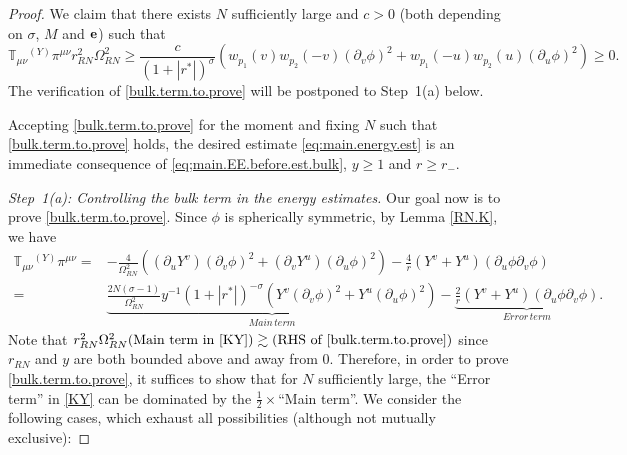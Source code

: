 \documentclass[10pt, reqno]{amsart}
\theoremstyle{definition}
\theoremstyle{remark}
\numberwithin{equation}{section}
\newcommand{\rd}{\partial}
\newcommand{\0}{\emptyset}
\newcommand{\Omg}{\Omega}
\newcommand{\f}{\frac}
\newcommand{\pfstep}[1]{\vspace{.5em} {\it #1.}}
\begin{document}
\begin{proof}
We claim that there exists $N$ sufficiently large and $c>0$ (both depending on $\sigma$, $M$ and ${\bf e}$) such that
\begin{equation}\label{bulk.term.to.prove}
\mathbb T_{\mu\nu}{ }^{(Y)}\pi^{\mu\nu}r_{RN}^2 \Omg_{RN}^2\geq \f{c}{(1+|r^*|)^{\sigma}}(w_{p_1}(v)w_{p_2}(-v)(\rd_v\phi)^2+w_{p_1}(-u)w_{p_2}(u)(\rd_u\phi)^2)\geq 0.
\end{equation}
The verification of \eqref{bulk.term.to.prove} will be postponed to Step~1(a) below.

Accepting \eqref{bulk.term.to.prove} for the moment and fixing $N$ such that \eqref{bulk.term.to.prove} holds, the desired estimate \eqref{eq:main.energy.est} is an immediate consequence of \eqref{eq;main.EE.before.est.bulk}, $y\geq 1$ and $r\geq r_-$.

\pfstep{Step~1(a): Controlling the bulk term in the energy estimates} Our goal now is to prove \eqref{bulk.term.to.prove}. Since $\phi$ is spherically symmetric, by Lemma \ref{RN.K}, we have
\begin{equation}\label{KY}
\begin{split}
\mathbb T_{\mu\nu}{ }^{(Y)}\pi^{\mu\nu}=&-\f{4}{\Omg_{RN}^2}\left((\rd_uY^v)(\rd_v\phi)^2+(\rd_vY^u)(\rd_u\phi)^2\right)-\f {4}r (Y^v+Y^u)(\rd_u\phi\rd_v\phi)\\
=&\underbrace{\f{2N(\sigma-1)}{\Omg_{RN}^2}y^{-1}(1+|r^*|)^{-\sigma}\left(Y^v(\rd_v\phi)^2+Y^u(\rd_u\phi)^2\right)}_{Main\,term}-\underbrace{\f {2}r (Y^v+Y^u)(\rd_u\phi\rd_v\phi)}_{Error\,term}.
\end{split}
\end{equation}
Note that $r_{RN}^2 \Omg_{RN}^2 \mbox{(Main term in \eqref{KY})}\gtrsim \mbox{(RHS of \eqref{bulk.term.to.prove})}$ since $r_{RN}$ and $y$ are both bounded above and away from $0$. Therefore, in order to prove \eqref{bulk.term.to.prove}, it suffices to show that for $N$ sufficiently large, the ``Error term'' in \eqref{KY} can be dominated by the $\f 12 \times$``Main term''. We consider the following cases, which exhaust all possibilities (although not mutually exclusive):




\end{proof}
\end{document}
